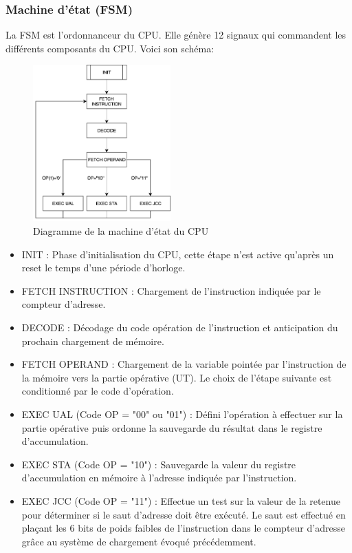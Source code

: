 \documentclass{article}
\begin{document}
    \subsubsection{Machine d'état (FSM)}
    \par La FSM est l'ordonnanceur du CPU. Elle génère 12 signaux qui commandent les différents composants du CPU. Voici son schéma: 
    \begin{figure}[h]
        \centering
        \includegraphics[width=200px]{../doc/FSMDiagram.png}
        \caption{Diagramme de la machine d'état du CPU}
        \label{fig:fsm_diagram}
    \end{figure}
    \begin{itemize}\renewcommand{\labelitemi}{$\bullet$} 
        \item INIT : Phase d'initialisation du CPU, cette étape n'est active qu'après un reset le temps d'une période d'horloge. 
        \item FETCH INSTRUCTION : Chargement de l'instruction indiquée par le compteur d'adresse.
        \item DECODE : Décodage du code opération de l'instruction et anticipation du prochain chargement de mémoire.
        \item FETCH OPERAND : Chargement de la variable pointée par l'instruction de la mémoire vers la partie opérative (UT). Le choix de l'étape suivante est conditionné par le code d'opération.
        \item EXEC UAL (Code OP = "00" ou "01") : Défini l'opération à effectuer sur la partie opérative puis ordonne la sauvegarde du résultat dans le registre d'accumulation. 
        \item EXEC STA (Code OP = "10") : Sauvegarde la valeur du registre d'accumulation en mémoire à l'adresse indiquée par l'instruction.
        \item EXEC JCC (Code OP = "11") : Effectue un test sur la valeur de la retenue pour déterminer si le saut d'adresse doit être exécuté. Le saut est effectué en plaçant les 6 bits de poids faibles de l'instruction dans le compteur d'adresse grâce au système de chargement évoqué précédemment.
    \end{itemize}
\end{document}
